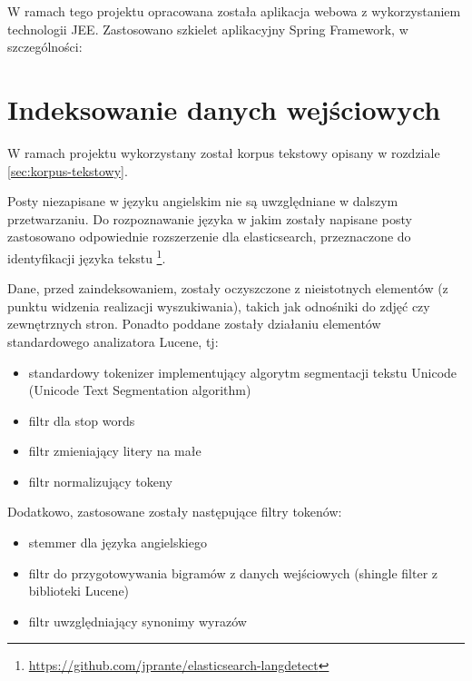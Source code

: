 \documentclass[runningheads]{llncs}
\begin{document}

W ramach tego projektu opracowana została aplikacja webowa z wykorzystaniem 
technologii JEE. Zastosowano szkielet aplikacyjny Spring Framework, w
szczególności:

\section{Indeksowanie danych wejściowych}
\label{sec:indeksowanie-danych-wejsciowych}
W ramach projektu wykorzystany został korpus tekstowy opisany w rozdziale \ref{sec:korpus-tekstowy}.

Posty niezapisane w języku angielskim nie są uwzględniane w dalszym
przetwarzaniu. 
Do rozpoznawanie  języka w jakim zostały napisane posty zastosowano
odpowiednie rozszerzenie dla elasticsearch,  przeznaczone do identyfikacji
języka tekstu
\footnote{\url{https://github.com/jprante/elasticsearch-langdetect}}.

Dane, przed zaindeksowaniem, zostały oczyszczone z nieistotnych elementów (z
punktu widzenia realizacji wyszukiwania), takich jak odnośniki do  zdjęć czy
zewnętrznych stron. Ponadto poddane zostały działaniu elementów standardowego
analizatora Lucene, tj:
\begin{itemize}
  \item standardowy tokenizer implementujący algorytm segmentacji tekstu Unicode
  (Unicode Text Segmentation algorithm)
  \item filtr dla stop words
  \item filtr zmieniający litery na małe
  \item filtr normalizujący tokeny
\end{itemize}
Dodatkowo, zastosowane zostały następujące filtry tokenów:
\begin{itemize}
  \item stemmer dla języka angielskiego
  \item filtr do przygotowywania bigramów z danych wejściowych (shingle filter z
  biblioteki Lucene)
  \item filtr uwzględniający synonimy wyrazów
\end{itemize}
\end{document}
